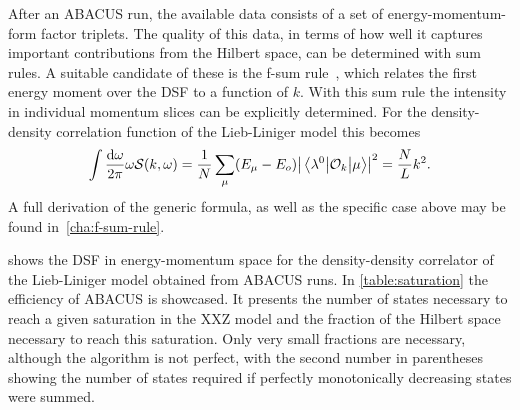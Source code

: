 \documentclass[11pt, a4paper]{report} %
\begin{document}
After an ABACUS run, the available data consists of a set of energy-momentum-form factor triplets.
The quality of this data, in terms of how well it captures important contributions from the Hilbert space, can be determined with sum rules.
A suitable candidate of these is the f-sum rule~\cite{Caux2007a}, which relates the first energy moment over the DSF to a function of \(k\).
With this sum rule the intensity in individual momentum slices can be explicitly determined.
For the density-density correlation function of the Lieb-Liniger model this becomes
\begin{align}
  \int \frac{\dd \omega}{2\pi} \omega \mathcal{S}(k, \omega) = \frac{1}{N}\sum_{\mu}(E_{\mu}-E_o)\abs{\mel{\lambda^0}{\mathcal{O}_k}{\mu}}^2  = \frac{N}{L} k^2.
\end{align}
A full derivation of the generic formula, as well as the specific case above may be found in~\cref{cha:f-sum-rule}. 

 shows the DSF in energy-momentum space for the density-density correlator of the Lieb-Liniger model obtained from ABACUS runs.
In \cref{table:saturation} the efficiency of ABACUS is showcased.
It presents the number of states necessary to reach a given saturation in the XXZ model and the fraction of the Hilbert space necessary to reach this saturation.
Only very small fractions are necessary, although the algorithm is not perfect, with the second number in parentheses showing the number of states required if perfectly monotonically decreasing states were summed.
\end{document}

